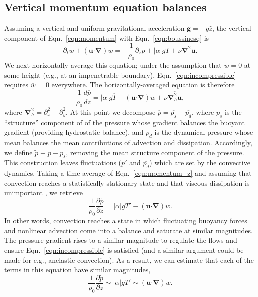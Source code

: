 \documentclass{aastex631}
\renewcommand{\vec}[1]{\boldsymbol{#1}}
\renewcommand{\dot}{\vec{\cdot}}
\newcommand{\grad}{\vec{\nabla}}
\begin{document}
\subsection{Vertical momentum equation balances}
\label{sec:theory_momentum}
Assuming a vertical and uniform gravitational acceleration $\vec{g} = -g\hat{z}$, the vertical component of Eqn.~\ref{eqn:momentum} with Eqn.~\ref{eqn:boussinesq} is
\begin{equation}
\partial_t w + (\vec{u}\dot\grad)w = -\frac{1}{\rho_0}\partial_z p + |\alpha|g T + \nu\grad^2 \vec{u}.
\label{eqn:momentum_z}
\end{equation}
We next horizontally average this equation; under the assumption that $\overline{w} = 0$ at some height (e.g., at an impenetrable boundary), Eqn.~\ref{eqn:incompressible} requires $\overline{w}$ = 0 everywhere.
The horizontally-averaged equation is therefore
\begin{equation}
\frac{1}{\rho_0}\frac{d \overline{p}}{dz} = |\alpha| g \overline{T} - \overline{(\vec{u}\dot\grad)w} + \nu\overline{\grad_h^2 \vec{u}},
\end{equation}
where $\grad_h^2 = \partial_x^2 + \partial_y^2$.
At this point we decompose $\overline{p} = \overline{p_s} + \overline{p_d}$, where $p_s$ is the ``structure'' component of of the pressure whose gradient balances the buoyant gradient (providing hydrostatic balance), and $p_d$ is the dynamical pressure whose mean balances the mean contributions of advection and dissipation.
Accordingly, we define $\tilde{p} \equiv p - \overline{p_s}$, removing the mean structure component of the pressure.
This construction leaves fluctuations ($p'$ and $\overline{p_d}$) which are set by the convective dynamics.
Taking a time-average of Eqn.~\ref{eqn:momentum_z} and assuming that convection reaches a statistically stationary state and that viscous dissipation is unimportant \citep[which is a common assumption, but may not always apply in stellar contexts per][]{currie_browning_2017}, we retrieve
\begin{equation}
\frac{1}{\rho_0}\frac{\partial \tilde{p}}{\partial z} = |\alpha| g T' - (\vec{u}\dot\grad)w.
\label{eqn:fluc_momentum_z}
\end{equation}
In other words, convection reaches a state in which fluctuating buoyancy forces and nonlinear advection come into a balance and saturate at similar magnitudes.
The pressure gradient rises to a similar magnitude to regulate the flows and ensure Eqn.~\ref{eqn:incompressible} is satisfied (and a similar argument could be made for e.g., anelastic convection).
As a result, we can estimate that each of the terms in this equation have similar magnitudes,
\begin{equation}
\frac{1}{\rho_0}\frac{\partial \tilde{p}}{\partial z} \sim |\alpha| g T' \sim (\vec{u}\dot\grad)w.
\label{eqn:momentum_balance}
\end{equation}
\end{document}

